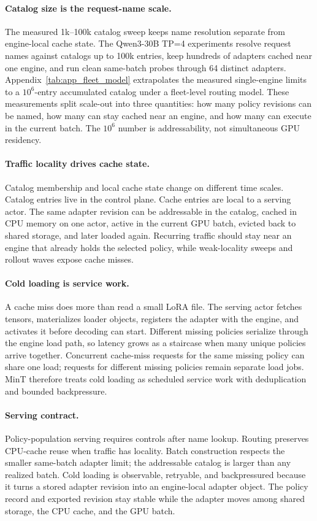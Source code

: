 \paragraph{Catalog size is the request-name scale.}
The measured 1k--100k catalog sweep keeps name resolution separate from engine-local cache state. The Qwen3-30B TP=4 experiments resolve request names against catalogs up to 100k entries, keep hundreds of adapters cached near one engine, and run clean same-batch probes through 64 distinct adapters. Appendix~\cref{tab:app_fleet_model} extrapolates the measured single-engine limits to a $10^6$-entry accumulated catalog under a fleet-level routing model. These measurements split scale-out into three quantities: how many policy revisions can be named, how many can stay cached near an engine, and how many can execute in the current batch. The $10^6$ number is addressability, not simultaneous GPU residency.

\paragraph{Traffic locality drives cache state.}
Catalog membership and local cache state change on different time scales. Catalog entries live in the control plane. Cache entries are local to a serving actor. The same adapter revision can be addressable in the catalog, cached in CPU memory on one actor, active in the current GPU batch, evicted back to shared storage, and later loaded again. Recurring traffic should stay near an engine that already holds the selected policy, while weak-locality sweeps and rollout waves expose cache misses.

\paragraph{Cold loading is service work.}
A cache miss does more than read a small LoRA file. The serving actor fetches tensors, materializes loader objects, registers the adapter with the engine, and activates it before decoding can start. Different missing policies serialize through the engine load path, so latency grows as a staircase when many unique policies arrive together. Concurrent cache-miss requests for the same missing policy can share one load; requests for different missing policies remain separate load jobs. MinT therefore treats cold loading as scheduled service work with deduplication and bounded backpressure.

\paragraph{Serving contract.}
Policy-population serving requires controls after name lookup. Routing preserves CPU-cache reuse when traffic has locality. Batch construction respects the smaller same-batch adapter limit; the addressable catalog is larger than any realized batch. Cold loading is observable, retryable, and backpressured because it turns a stored adapter revision into an engine-local adapter object. The policy record and exported revision stay stable while the adapter moves among shared storage, the CPU cache, and the GPU batch.

